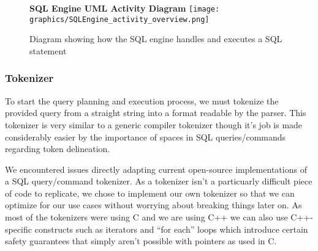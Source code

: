 \documentclass[letterpaper, 12pt]{article}
\begin{document}
\begin{figure}
  \centering
  \textbf{SQL Engine UML Activity Diagram}
  \texttt{[image: graphics/SQLEngine\_activity\_overview.png]}
  \caption{Diagram showing how the SQL engine handles and executes a SQL statement}
\end{figure}

\subsubsection{Tokenizer}
To start the query planning and execution process, we must tokenize the provided query
from a straight string into a format readable by the parser. This tokenizer is very
similar to a generic compiler tokenizer though it's job is made considerably easier
by the importance of spaces in SQL queries/commands regarding token delineation.
\par\vspace{\baselineskip}
We encountered issues directly adapting current open-source implementations of a
SQL query/command tokenizer. As a tokenizer isn't a particuarly difficult piece of
code to replicate, we chose to implement our own tokenizer so that
we can optimize for our use cases without worrying about breaking things later on.
As most of the tokenizers were using C and we are using C++ we can also use C++-specific
constructs such as iterators and ``for each'' loops which introduce certain safety guarantees
that simply aren't possible with pointers as used in C.
\end{document}
